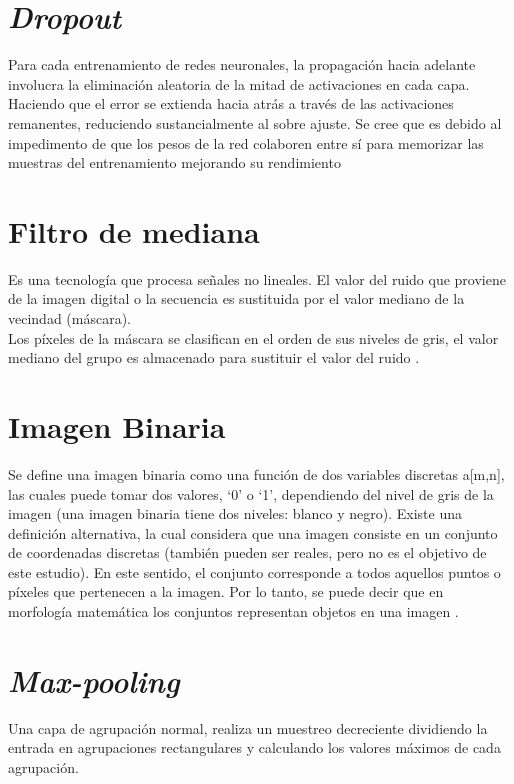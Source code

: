 \section{\textit{Dropout}}

Para cada entrenamiento de redes neuronales, la propagación hacia adelante involucra la eliminación aleatoria de la mitad de activaciones en cada capa. Haciendo que el error se extienda hacia atrás a través de las activaciones remanentes, reduciendo sustancialmente al sobre ajuste. Se cree que es debido al impedimento de que los pesos de la red colaboren entre sí para memorizar las muestras del entrenamiento mejorando su rendimiento \cite{hinton2012improving}

\section{Filtro de mediana}

Es una tecnología que procesa señales no lineales. El valor del ruido que proviene de la imagen digital o la secuencia es sustituida por el valor mediano de la vecindad (máscara).\\
Los píxeles de la máscara se clasifican en el orden de sus niveles de gris, el valor mediano del grupo es almacenado para sustituir el valor del ruido \cite{zhu2012improved}.

\section{Imagen Binaria} Se define una imagen binaria como una función de dos variables discretas
a[m,n], las cuales puede tomar dos valores, ‘0’ o ‘1’, dependiendo del nivel de gris de la
imagen (una imagen binaria tiene dos niveles: blanco y negro). Existe una definición alternativa, la cual considera que una imagen consiste en un conjunto de
coordenadas discretas (también pueden ser reales, pero no es el objetivo de este estudio). En este sentido, el conjunto corresponde a todos aquellos puntos o píxeles que pertenecen a la imagen. Por lo tanto, se puede decir que en morfología matemática los conjuntos representan objetos en una imagen \cite{ref_12}.

\section{\textit{Max-pooling}}

Una capa de agrupación normal, realiza un muestreo decreciente dividiendo la entrada en agrupaciones rectangulares y calculando los valores máximos de cada agrupación.\\

